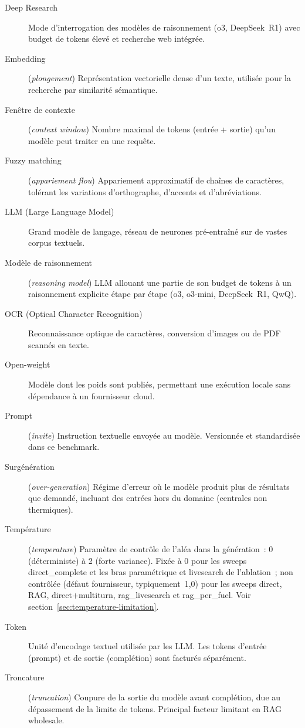 \begin{description}
\item[Deep Research] Mode d'interrogation des modèles de raisonnement (o3, DeepSeek~R1) avec budget de tokens élevé et recherche web intégrée.
\item[Embedding] (\emph{plongement}) Représentation vectorielle dense d'un texte, utilisée pour la recherche par similarité sémantique.
\item[Fenêtre de contexte] (\emph{context window}) Nombre maximal de tokens (entrée + sortie) qu'un modèle peut traiter en une requête.
\item[Fuzzy matching] (\emph{appariement flou}) Appariement approximatif de chaînes de caractères, tolérant les variations d'orthographe, d'accents et d'abréviations.
\item[LLM (Large Language Model)] Grand modèle de langage, réseau de neurones pré-entraîné sur de vastes corpus textuels.
\item[Modèle de raisonnement] (\emph{reasoning model}) LLM allouant une partie de son budget de tokens à un raisonnement explicite étape par étape (o3, o3-mini, DeepSeek~R1, QwQ).
\item[OCR (Optical Character Recognition)] Reconnaissance optique de caractères, conversion d'images ou de PDF scannés en texte.
\item[Open-weight] Modèle dont les poids sont publiés, permettant une exécution locale sans dépendance à un fournisseur cloud.
\item[Prompt] (\emph{invite}) Instruction textuelle envoyée au modèle. Versionnée et standardisée dans ce benchmark.
\item[Surgénération] (\emph{over-generation}) Régime d'erreur où le modèle produit plus de résultats que demandé, incluant des entrées hors du domaine (centrales non thermiques).
\item[Température] (\emph{temperature}) Paramètre de contrôle de l'aléa dans la génération~: 0 (déterministe) à 2 (forte variance). Fixée à 0 pour les sweeps direct\_complete et les bras paramétrique et livesearch de l'ablation~; non contrôlée (défaut fournisseur, typiquement~1,0) pour les sweeps direct, RAG, direct+multiturn, rag\_livesearch et rag\_per\_fuel. Voir section~\ref{sec:temperature-limitation}.
\item[Token] Unité d'encodage textuel utilisée par les LLM. Les tokens d'entrée (prompt) et de sortie (complétion) sont facturés séparément.
\item[Troncature] (\emph{truncation}) Coupure de la sortie du modèle avant complétion, due au dépassement de la limite de tokens. Principal facteur limitant en RAG wholesale.
\end{description}

